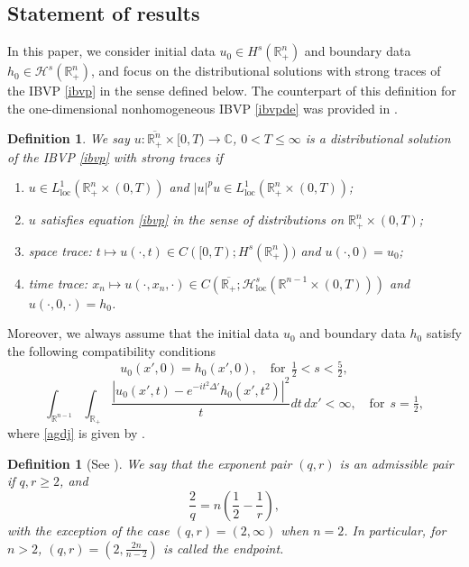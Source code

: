 \documentclass[preprint,compress,12pt]{elsarticle}
\newtheorem{definition}[theorem]{Definition}
\numberwithin{equation}{section}
\begin{document}
\subsection{Statement of results}
In this paper, we consider initial data $u_{0}\in H^{s}(\mathbb{R}^{n}_{+})$ and boundary data $h_{0}\in \mathcal{H}^{s}(\mathbb{R}^{n}_{+})$, and focus on the distributional solutions  with strong traces of the IBVP \eqref{ibvp}  in the sense defined below.  The counterpart of this definition for the one-dimensional nonhomogeneous IBVP \eqref{ibvpde} was provided in \cite{chatter}.
	\begin{definition}
		We say $u:\overline{\mathbb{R}^{n}_{+}}\times [0,T)\rightarrow\mathbb{C}$, $0<T\leq\infty$ is a distributional solution of the IBVP \eqref{ibvp} with strong traces if
		\begin{enumerate}[label=(\roman*)]
			\item $u\in L^{1}_{\mathrm{loc}}(\mathbb{R}_{+}^{n}\times(0,T))$ and $|u|^{p}u\in L^{1}_{\mathrm{loc}}(\mathbb{R}_{+}^{n}\times(0,T))$;
			\item $u$ satisfies  equation  \eqref{ibvp} in the sense of distributions on $\mathbb{R}_{+}^{n}\times(0,T)$;
			\item \label{covenant} space trace:  $t \mapsto u(\cdot,t) \in C([0,T);H^{s}(\mathbb{R}_{+}^{n}))$ and $u(\cdot,0)=u_{0}$;
			\item \label{hollow} time trace:  $x_{n} \mapsto u(\cdot,x_{n},\cdot) \in C\left(\overline{\mathbb{R}_{+}};\mathcal{H}^{s}_{\mathrm{loc}}(\mathbb{R}^{n-1}\times(0,T))\right)$ and $u(\cdot,0,\cdot)=h_{0}$.
		\end{enumerate}
	\end{definition}
Moreover, we always assume that the initial data $u_{0}$ and boundary data  $h_{0}$ satisfy the following compatibility conditions
\begin{equation}\label{comll}
	u_{0}(x',0)=h_{0}(x',0),\quad \text{for}\ \ \tfrac{1}{2}<s<\tfrac{5}{2},
\end{equation}
\begin{equation} \label{agdj} \int_{\mathbb{R}^{n-1}}\int_{\mathbb{R}_{+}}\frac{|u_{0}(x',t)-e^{-it^{2}\Delta'}h_{0}(x',t^{2})|^{2}}{t}dt\,dx'<\infty,\quad \text{for}\ \ s=\tfrac{1}{2},	
\end{equation}
where \eqref{agdj} is given by \cite{facilitate}.
	\begin{definition}	[See \cite{tao}]\label{fraternity}
		We say that the exponent pair $(q,r)$ is an admissible pair if  $q, r\geq 2$, and
		\begin{equation}
			\frac{2}{q}=n\left(\frac{1}{2}-\frac{1}{r}\right),
		\end{equation}
		with the exception of the case $(q, r) = (2, \infty)$ when $n = 2$.
		In particular, for $n>2$, $(q,r)=(2,\frac{2n}{n-2})$ is called the endpoint.
	\end{definition}
\end{document}
